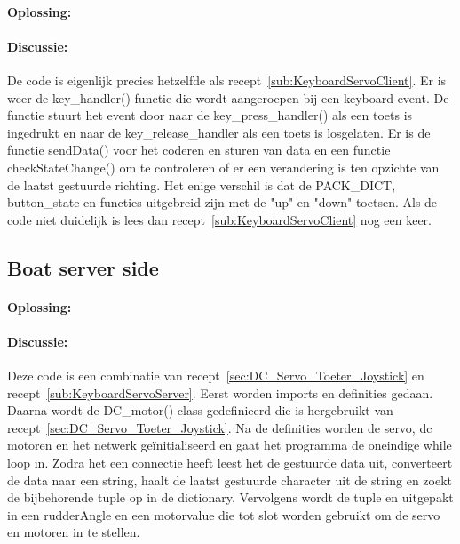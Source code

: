 \paragraph{Oplossing:}

\paragraph{Discussie:} De code is eigenlijk precies hetzelfde als recept~\ref{sub:KeyboardServoClient}. Er is weer de key\_handler() functie die wordt aangeroepen bij een keyboard event. De functie stuurt het event door naar de key\_press\_handler() als een toets is ingedrukt en naar de key\_release\_handler als een toets is losgelaten. Er is de functie sendData() voor het coderen en sturen van data en een functie checkStateChange() om te controleren of er een verandering is ten opzichte van de laatst gestuurde richting. Het enige verschil is dat de PACK\_DICT, button\_state en functies uitgebreid zijn met de "up" en "down" toetsen. Als de code niet duidelijk is lees dan recept~\ref{sub:KeyboardServoClient} nog een keer.

\newpage
\subsection{Boat server side}
\paragraph{Oplossing:}

\paragraph{Discussie:} Deze code is een combinatie van recept~\ref{sec:DC_Servo_Toeter_Joystick} en recept~\ref{sub:KeyboardServoServer}. Eerst worden imports en definities gedaan. Daarna wordt de DC\_motor() class gedefinieerd die is hergebruikt van recept~\ref{sec:DC_Servo_Toeter_Joystick}. 
Na de definities worden de servo, dc motoren en het netwerk ge\"initialiseerd en gaat het programma de oneindige while loop in. Zodra het een connectie heeft leest het de gestuurde data uit, converteert de data naar een string, haalt de laatst gestuurde character uit de string en zoekt de bijbehorende tuple op in de dictionary. Vervolgens wordt de tuple en uitgepakt in een rudderAngle en een motorvalue die tot slot worden gebruikt om de servo en motoren in te stellen. 






